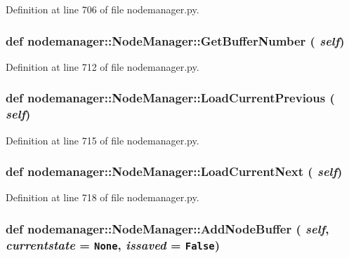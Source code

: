 Definition at line 706 of file nodemanager.py.\hypertarget{classnodemanager_1_1NodeManager_7b29a1052a7fa6ee188b166e3177485f}{
\subsubsection[GetBufferNumber]{\setlength{\rightskip}{0pt plus 5cm}def nodemanager::Node\-Manager::Get\-Buffer\-Number ( {\em self})}}
\label{classnodemanager_1_1NodeManager_7b29a1052a7fa6ee188b166e3177485f}




Definition at line 712 of file nodemanager.py.\hypertarget{classnodemanager_1_1NodeManager_2f332723fc8da42f3fe9622a3b92356d}{
\subsubsection[LoadCurrentPrevious]{\setlength{\rightskip}{0pt plus 5cm}def nodemanager::Node\-Manager::Load\-Current\-Previous ( {\em self})}}
\label{classnodemanager_1_1NodeManager_2f332723fc8da42f3fe9622a3b92356d}




Definition at line 715 of file nodemanager.py.\hypertarget{classnodemanager_1_1NodeManager_9c706ee3cf44203d266c3c40f1145b47}{
\subsubsection[LoadCurrentNext]{\setlength{\rightskip}{0pt plus 5cm}def nodemanager::Node\-Manager::Load\-Current\-Next ( {\em self})}}
\label{classnodemanager_1_1NodeManager_9c706ee3cf44203d266c3c40f1145b47}




Definition at line 718 of file nodemanager.py.\hypertarget{classnodemanager_1_1NodeManager_eac2e9ec8e243bb88df764e5fb8d3f27}{
\subsubsection[AddNodeBuffer]{\setlength{\rightskip}{0pt plus 5cm}def nodemanager::Node\-Manager::Add\-Node\-Buffer ( {\em self},  {\em currentstate} = {\tt None},  {\em issaved} = {\tt False})}}
\label{classnodemanager_1_1NodeManager_eac2e9ec8e243bb88df764e5fb8d3f27}




